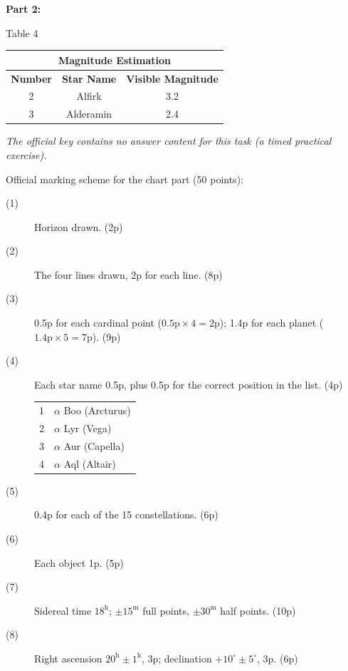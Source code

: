 \textbf{Part 2:}

\begin{center}
Table 4

\begin{tabular}{|c|c|c|}
\hline
\multicolumn{3}{|c|}{\textbf{Magnitude Estimation}}\\
\hline
\textbf{Number} & \textbf{Star Name} & \textbf{Visible Magnitude}\\
\hline
2 & Alfirk & 3.2\\
\hline
3 & Alderamin & 2.4\\
\hline
\end{tabular}
\end{center}

\textit{The official key contains no answer content for this task (a timed practical exercise).}

Official marking scheme for the chart part (50 points):

\begin{description}
\item[(1)] Horizon drawn. \hfill(2p)
\item[(2)] The four lines drawn, 2p for each line. \hfill(8p)
\item[(3)] 0.5p for each cardinal point ($0.5\mathrm{p} \times 4 =
  2\mathrm{p}$); 1.4p for each planet ($1.4\mathrm{p} \times 5 =
  7\mathrm{p}$). \hfill(9p)
\item[(4)] Each star name 0.5p, plus 0.5p for the correct position in the
  list. \hfill(4p)

  \begin{center}
  \begin{tabular}{cl}
  \hline
  1 & $\alpha$ Boo (Arcturus) \\
  2 & $\alpha$ Lyr (Vega) \\
  3 & $\alpha$ Aur (Capella) \\
  4 & $\alpha$ Aql (Altair) \\
  \hline
  \end{tabular}
  \end{center}
\item[(5)] 0.4p for each of the 15 constellations. \hfill(6p)
\item[(6)] Each object 1p. \hfill(5p)
\item[(7)] Sidereal time $18^{\mathrm{h}}$; $\pm 15^{\mathrm{m}}$ full
  points, $\pm 30^{\mathrm{m}}$ half points. \hfill(10p)
\item[(8)] Right ascension $20^{\mathrm{h}} \pm 1^{\mathrm{h}}$, 3p;
  declination $+10^\circ \pm 5^\circ$, 3p. \hfill(6p)
\end{description}

